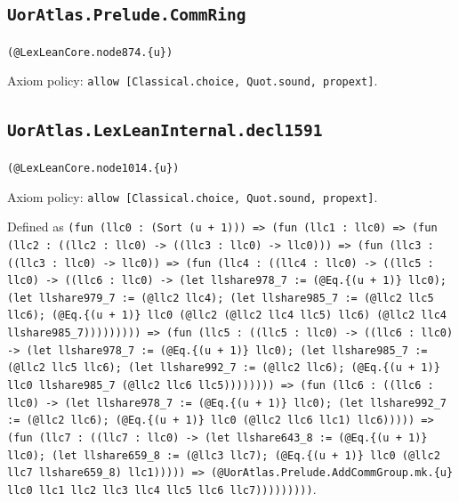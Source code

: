 \documentclass[11pt]{article}
\begin{document}
\subsection*{\texttt{UorAtlas.Prelude.CommRing}}
\noindent\texttt{(@LexLeanCore.node874.\{u\})}\par
\noindent Axiom policy: \texttt{allow [Classical.choice, Quot.sound, propext]}.\par
\subsection*{\texttt{UorAtlas.LexLeanInternal.decl1591}}
\noindent\texttt{(@LexLeanCore.node1014.\{u\})}\par
\noindent Axiom policy: \texttt{allow [Classical.choice, Quot.sound, propext]}.\par
\noindent Defined as \texttt{(fun (llc0 : (Sort (u + 1))) => (fun (llc1 : llc0) => (fun (llc2 : ((llc2 : llc0) -> ((llc3 : llc0) -> llc0))) => (fun (llc3 : ((llc3 : llc0) -> llc0)) => (fun (llc4 : ((llc4 : llc0) -> ((llc5 : llc0) -> ((llc6 : llc0) -> (let llshare978\_7 := (@Eq.\{(u + 1)\} llc0); (let llshare979\_7 := (@llc2 llc4); (let llshare985\_7 := (@llc2 llc5 llc6); (@Eq.\{(u + 1)\} llc0 (@llc2 (@llc2 llc4 llc5) llc6) (@llc2 llc4 llshare985\_7))))))))) => (fun (llc5 : ((llc5 : llc0) -> ((llc6 : llc0) -> (let llshare978\_7 := (@Eq.\{(u + 1)\} llc0); (let llshare985\_7 := (@llc2 llc5 llc6); (let llshare992\_7 := (@llc2 llc6); (@Eq.\{(u + 1)\} llc0 llshare985\_7 (@llc2 llc6 llc5)))))))) => (fun (llc6 : ((llc6 : llc0) -> (let llshare978\_7 := (@Eq.\{(u + 1)\} llc0); (let llshare992\_7 := (@llc2 llc6); (@Eq.\{(u + 1)\} llc0 (@llc2 llc6 llc1) llc6))))) => (fun (llc7 : ((llc7 : llc0) -> (let llshare643\_8 := (@Eq.\{(u + 1)\} llc0); (let llshare659\_8 := (@llc3 llc7); (@Eq.\{(u + 1)\} llc0 (@llc2 llc7 llshare659\_8) llc1))))) => (@UorAtlas.Prelude.AddCommGroup.mk.\{u\} llc0 llc1 llc2 llc3 llc4 llc5 llc6 llc7)))))))))}.\par
\end{document}
